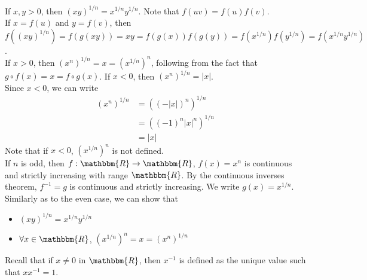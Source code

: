 \documentclass[10pt]{extarticle}
\newcommand{\R}{\mathbbm{R}}
\begin{document}
    If $x,y > 0$, then $(xy)^{1/n} = x^{1/n}y^{1/n}$. Note that $f(uv) = f(u)f(v)$.\\

    If $x = f(u)$ and $y = f(v)$, then $f\left((xy)^{1/n}\right) = f(g(xy)) = xy = f(g(x))f(g(y)) = f(x^{1/n})f(y^{1/n}) = f(x^{1/n}y^{1/n})$.\\

    If $x > 0$, then $\left(x^{n}\right)^{1/n} = x = \left(x^{1/n}\right)^{n}$, following from the fact that $g\circ f(x) = x = f\circ g(x)$. If $x < 0$, then $\left(x^n\right)^{1/n} = |x|$.\\

    Since $x < 0$, we can write
    \begin{align*}
      (x^n)^{1/n} &= \left(\left(-|x|\right)^{n}\right)^{1/n}\\
                  &= \left(\left(-1\right)^n|x|^{n}\right)^{1/n}\\
                  &= |x|
    \end{align*}
    Note that if $x < 0$, $\left(x^{1/n}\right)^{n}$ is not defined.\\

    If $n$ is odd, then $f: \R\rightarrow \R$, $f(x) = x^n$ is continuous and strictly increasing with range $\R$. By the continuous inverses theorem, $f^{-1} = g$ is continuous and strictly increasing. We write $g(x)=x^{1/n}$.\\

    Similarly as to the even case, we can show that
    \begin{itemize}
      \item $(xy)^{1/n} = x^{1/n}y^{1/n}$
      \item $\forall x\in\R$, $\left(x^{1/n}\right)^n = x = \left(x^n\right)^{1/n}$
    \end{itemize}
    Recall that if $x\neq 0$ in $\R$, then $x^{-1}$ is defined as the unique value such that $xx^{-1} = 1$.\\
\end{document}
